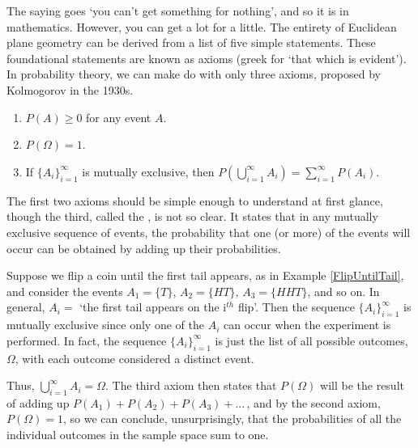The saying goes `you can't get something for nothing', and so it is in mathematics. However, you can get a lot for a little. The entirety of Euclidean plane geometry can be derived from a list of five simple statements. These foundational statements are known as axioms (greek for `that which is evident'). In probability theory, we can make do with only three axioms, proposed by Kolmogorov \cite{KolmogorovFoundations} in the 1930s. 
\begin{enumerate}
\item $P(A) \geq 0$ for any event $A$.
\item $P(\Omega) = 1$.
\vspace*{-7pt}
\item If $\{A_i\}_{i=1}^{\infty}$ is mutually exclusive, then $\displaystyle P\left(\bigcup_{i=1}^{\infty} A_i\right) = \sum_{i=1}^{\infty} P(A_i)$.
\end{enumerate}
\par
The first two axioms should be simple enough to understand at first glance, though the third, called the , is not so clear. It states that in any mutually exclusive sequence of events, the probability that one (or more) of the events will occur can be obtained by adding up their probabilities.
\par
\begin{examp}\label{flipuntiltailsumoutcomes}
Suppose we flip a coin until the first tail appears, as in Example \ref{FlipUntilTail}, and consider the events $A_1 = \{T\}$, $A_2 = \{HT\}$, $A_3 = \{HHT\}$, and so on. In general, $A_i =$ `the first tail appears on the i$^{th}$ flip'. Then the sequence $\{A_i\}_{i=1}^{\infty}$ is mutually exclusive since only one of the $A_i$ can occur when the experiment is performed. In fact, the sequence $\{A_i\}_{i=1}^{\infty}$ is just the list of all possible outcomes, $\Omega$, with each outcome considered a distinct event.
\par
\noindent Thus, $\bigcup_{i=1}^{\infty}A_i = \Omega$. The third axiom then states that $P(\Omega)$ will be the result of adding up $P(A_1) + P(A_2) + P(A_3) + ...\,$, and by the second axiom, $P(\Omega) = 1$, so we can conclude, unsurprisingly, that the probabilities of all the individual outcomes in the sample space sum to one.
\end{examp}
\par
